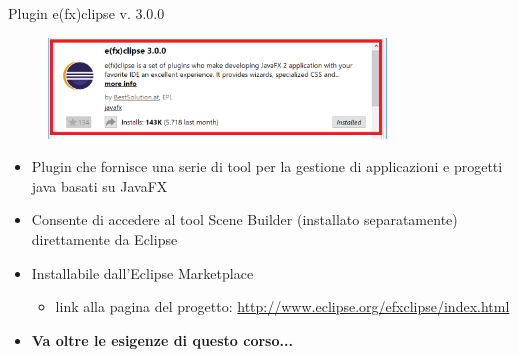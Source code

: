 \documentclass[presentation]{beamer}
\begin{document}
\begin{frame}{Plugin e(fx)clipse v. 3.0.0}
\begin{figure}
\includegraphics[width=0.8\textwidth]{img/plugin-install.png}
\end{figure}
\begin{itemize}\itemsep5pt
\item Plugin che fornisce una serie di tool per la gestione di applicazioni e progetti java basati su JavaFX
\item Consente di accedere al tool Scene Builder (installato separatamente) direttamente da Eclipse
\item Installabile dall'Eclipse Marketplace
\begin{itemize}
\item link alla pagina del progetto: \url{http://www.eclipse.org/efxclipse/index.html}
\end{itemize}
\item \textbf{Va oltre le esigenze di questo corso...}
\end{itemize}
\end{frame}
\end{document}
